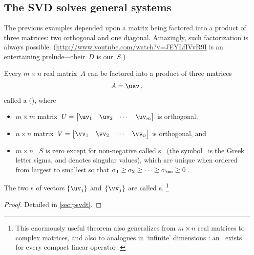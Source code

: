 \subsection{The SVD solves general systems}
\label{sec:svdsgs}


The previous examples depended upon a matrix being factored into a product of three matrices: 
two orthogonal and one diagonal.
Amazingly, such factorization is always possible.
(\url{http://www.youtube.com/watch?v=JEYLfIVvR9I} is an entertaining prelude---their~\(D\) is our~\(S\).)

\begin{theorem} \label{thm:svd} 
    Every $m\times n$ real matrix~$A$ can be factored into a product of three matrices
    \begin{equation}
        A=\usv\,,
    \end{equation}
    called a  (\svd), where
    \begin{itemize}
		\item $m\times m$ matrix~$U=\begin{bmatrix} \uv _1 &\uv_2&\cdots&\uv _m \end{bmatrix}$ is orthogonal, 
		\item $n\times n$ matrix~$V=\begin{bmatrix} \vv_1 &\vv_2&\cdots&\vv_n \end{bmatrix}$ is orthogonal, and      
        \item  $m\times n$ ~$S$ is zero except 
		for non-negative  called s \hlist\sigma\mn\ (the symbol~\bfidx{$\sigma$} is the Greek letter sigma, and denotes singular values), which are unique when ordered from largest to smallest so that $\sigma_1\geq \sigma_2 \geq \cdots \geq \sigma_{\mn}\geq 0$\,.
    \end{itemize}
    The two s of vectors \(\{\uv_j\}\) and~\(\{\vv_j\}\) are called s.%
    \footnote{This enormously useful theorem also generalizes from \(m\times n\) real matrices to complex matrices, and also to analogues in `infinite' dimensions  \cite[\S5]{Stewart1993}: an \svd\ exists for every compact linear operator \cite[\S7]{Kress2015}.}
\end{theorem}

\begin{proof}
Detailed in \cref{sec:psvdt}.
\end{proof}


